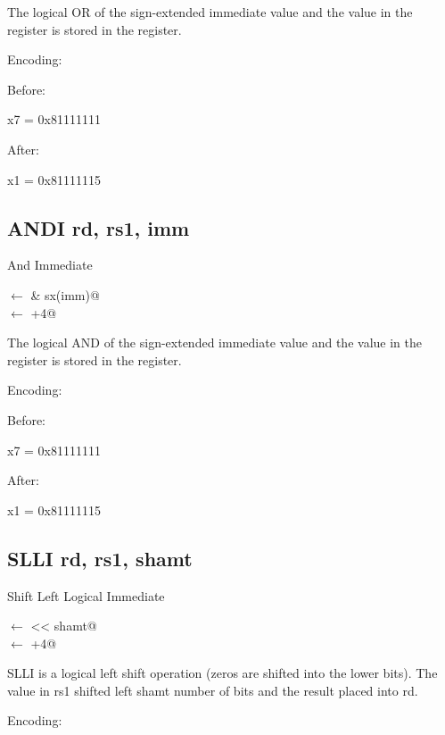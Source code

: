 The logical OR of the sign-extended immediate value and the value 
in the  register is stored in the  register.

Encoding:


Before:

x7 = 0x81111111

After:

x1 = 0x81111115

\subsection{ANDI rd, rs1, imm}

And Immediate

\verb@rd@ $\leftarrow$  & sx(imm)@\\
\verb@pc@ $\leftarrow$ \verb@pc+4@

The logical AND of the sign-extended immediate value and the value 
in the  register is stored in the  register.


Encoding:


Before:

x7 = 0x81111111

After:

x1 = 0x81111115

\subsection{SLLI rd, rs1, shamt}

Shift Left Logical Immediate

\verb@rd@ $\leftarrow$  << shamt@\\
\verb@pc@ $\leftarrow$ \verb@pc+4@


SLLI is a logical left shift operation (zeros are shifted
into the lower bits).  The value in rs1 shifted left shamt
number of bits and the result placed into rd.~\cite[p.~14]{rvismv1v22:2017}

Encoding:


